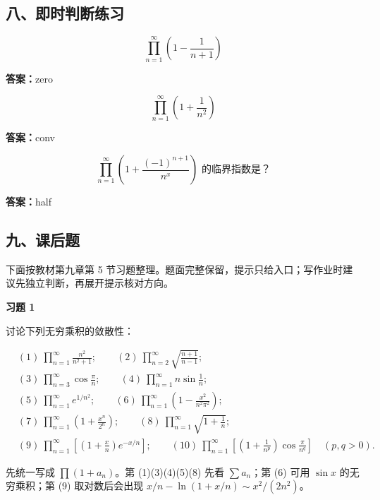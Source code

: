 \subsection*{八、即时判断练习}

\begin{quickcheck}
\[
          \prod_{n=1}^{\infty}\left(1-\frac{1}{n+1}\right)
        \]

\tcblower
\textbf{答案：}zero
\end{quickcheck}

\begin{quickcheck}
\[
          \prod_{n=1}^{\infty}\left(1+\frac{1}{n^2}\right)
        \]

\tcblower
\textbf{答案：}conv
\end{quickcheck}

\begin{quickcheck}
\[
          \prod_{n=1}^{\infty}\left(1+\frac{(-1)^{n+1}}{n^x}\right)
          \text{ 的临界指数是？}
        \]

\tcblower
\textbf{答案：}half
\end{quickcheck}

\subsection*{九、课后题}

下面按教材第九章第 5 节习题整理。题面完整保留，提示只给入口；写作业时建议先独立判断，再展开提示核对方向。

\begin{exercisebox}
\textbf{习题 1 }

讨论下列无穷乘积的敛散性：

\[
      \begin{aligned}
      &(1)\ \prod_{n=1}^{\infty}\frac{n^2}{n^2+1};\qquad
      (2)\ \prod_{n=2}^{\infty}\sqrt{\frac{n+1}{n-1}};\\
      &(3)\ \prod_{n=3}^{\infty}\cos\frac{\pi}{n};\qquad
      (4)\ \prod_{n=1}^{\infty}n\sin\frac1n;\\
      &(5)\ \prod_{n=1}^{\infty}e^{1/n^2};\qquad
      (6)\ \prod_{n=1}^{\infty}\left(1-\frac{x^2}{n^2\pi^2}\right);\\
      &(7)\ \prod_{n=1}^{\infty}\left(1+\frac{x^n}{2^n}\right);\qquad
      (8)\ \prod_{n=1}^{\infty}\sqrt{1+\frac1n};\\
      &(9)\ \prod_{n=1}^{\infty}\left[\left(1+\frac{x}{n}\right)e^{-x/n}\right];\qquad
      (10)\ \prod_{n=1}^{\infty}\left[\left(1+\frac1{n^p}\right)\cos\frac{\pi}{n^q}\right]\quad(p,q>0).
      \end{aligned}
      \]

\begin{hintbox}
先统一写成 \(\prod(1+a_n)\)。第 (1)(3)(4)(5)(8) 先看 \(\sum a_n\)；第 (6) 可用 \(\sin x\) 的无穷乘积；第 (9) 取对数后会出现 \(x/n-\ln(1+x/n)\sim x^2/(2n^2)\)。
\end{hintbox}
\end{exercisebox}

